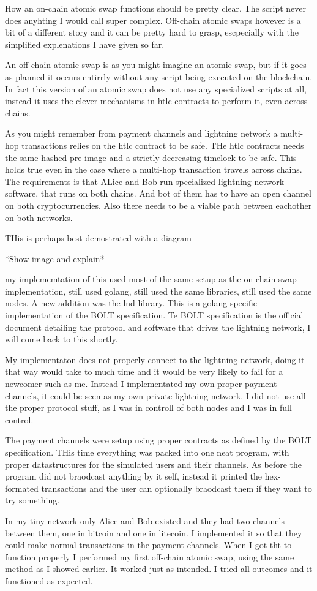 How an on-chain atomic swap functions should be pretty clear. The script never does
anyhting I would call super complex. Off-chain atomic swaps however is a bit of
a different story and it can be pretty hard to grasp, escpecially with the
simplified explenations I have given so far. 

An off-chain atomic swap is as you might imagine an atomic swap, but if
it goes as planned it occurs entirrly without any script being executed
on the blockchain. In fact this version of an atomic swap does not use any
specialized scripts at all, instead it uses the clever mechanisms in htlc
contracts to perform it, even across chains. 

As you might remember from payment channels and lightning network 
a multi-hop transactions relies on the htlc contract to be safe. 
THe htlc contracts needs the same hashed pre-image and a strictly
decreasing timelock to be safe. This holds true even in the 
case where a multi-hop transaction travels across chains.
The requirements is that ALice and Bob run specialized 
lightning network software, that runs on both chains. And 
bot of them has to have an open channel on both cryptocurrencies.
Also there needs to be a viable path between eachother
on both networks. 

THis is perhaps best demostrated with a diagram

*Show image and explain*

my implememtation of this used most of the same setup as the on-chain swap 
implementation, still used golang, still used the same libraries, still
used the same nodes. A new addition was the lnd library. This is a golang
specific implementation of the BOLT specification. Te BOLT specification
is the official document detailing the protocol and software that drives the 
lightning network, I will come back to this shortly.

My implementaton does not properly connect to the lightning network, doing
it that way would take to much time and it would be very likely to fail for
a newcomer such as me. Instead I implementated my own proper payment channels,
it could be seen as my own private lightning network. I did not use all the proper 
protocol stuff, as I was in controll of both nodes and I was in full control. 

The payment channels were setup using proper contracts as defined by the BOLT 
specification. THis time everything was packed into one neat program, with proper
datastructures for the simulated users and their channels. As before the program 
did not braodcast anything by it self, instead it printed the hex-formated transactions
and the user can optionally braodcast them if they want to try something.

In my tiny network only Alice and Bob existed and they had two channels between them,
one in bitcoin and one in litecoin. I implemented it so that they could make normal
transactions in the payment channels. When I got tht to function properly
I performed my first off-chain atomic swap, using the same method as I showed earlier.
It worked just as intended. I tried all outcomes and it functioned as expected.  
